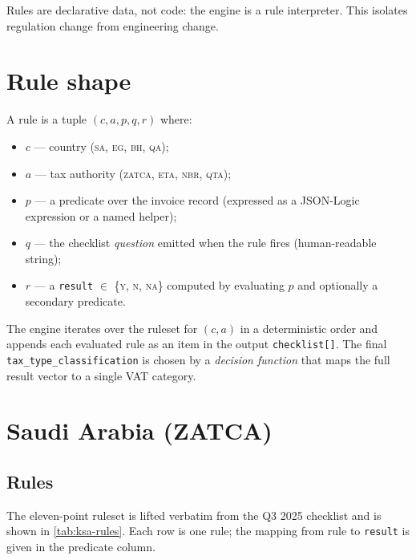 \documentclass[11pt,a4paper,twoside]{report}
\begin{document}
Rules are declarative data, not code: the engine is a rule interpreter.
This isolates regulation change from engineering change.

\section{Rule shape}

A rule is a tuple \mbox{$(c, a, p, q, r)$} where:
\begin{itemize}
  \item $c$ --- country (\textsc{sa}, \textsc{eg}, \textsc{bh}, \textsc{qa});
  \item $a$ --- tax authority (\textsc{zatca}, \textsc{eta}, \textsc{nbr}, \textsc{qta});
  \item $p$ --- a predicate over the invoice record (expressed as a JSON-Logic
              expression or a named helper);
  \item $q$ --- the checklist \emph{question} emitted when the rule fires
              (human-readable string);
  \item $r$ --- a \texttt{result} $\in$ \{\textsc{y}, \textsc{n}, \textsc{na}\}
              computed by evaluating $p$ and optionally a secondary predicate.
\end{itemize}

The engine iterates over the ruleset for $(c,a)$ in a deterministic
order and appends each evaluated rule as an item in the output
\texttt{checklist[]}. The final \texttt{tax\_type\_classification} is
chosen by a \emph{decision function} that maps the full result vector to
a single VAT category.

\section{Saudi Arabia (ZATCA)}

\subsection{Rules}

The eleven-point ruleset is lifted verbatim from the Q3 2025 checklist
and is shown in \cref{tab:ksa-rules}. Each row is one rule; the
mapping from rule to \texttt{result} is given in the predicate column.
\end{document}
